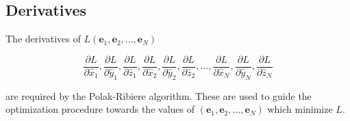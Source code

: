 \documentclass[12pt,double]{article}
\begin{document}

\vspace{2em}
\begin{centering}
\section*{Derivatives}
\end{centering}

\label{sec-Appendix-derivatives_ofL}

The derivatives of $L(\mathbf{e}_1,\mathbf{e}_2,...,\mathbf{e}_N)$
\begin{linenomath*} \begin{equation}
\frac{\partial L}{\partial \hat{x}_1},
\frac{\partial L}{\partial \hat{y}_1},
 \frac{\partial L}{\partial \hat{z}_1},
\frac{\partial L}{\partial \hat{x}_2},
\frac{\partial L}{\partial \hat{y}_2},
\frac{\partial L}{\partial \hat{z}_2},
...,
\frac{\partial L}{\partial \hat{x}_N},
\frac{\partial L}{\partial \hat{y}_N},
\frac{\partial L}{\partial \hat{z}_N}
\end{equation} \end{linenomath*}
are required by the Polak-Ribiere algorithm. These are used to guide
the optimization procedure towards the values of
$(\mathbf{e}_1,\mathbf{e}_2,...,\mathbf{e}_N)$ which minimize $L$.
\end{document}
